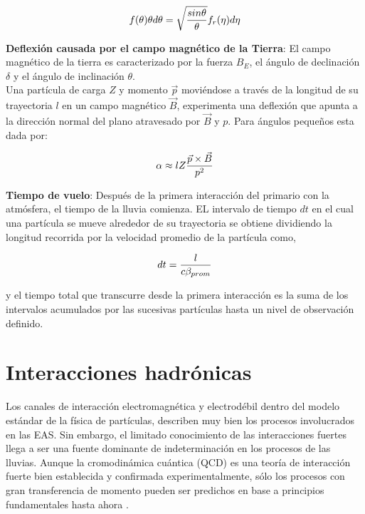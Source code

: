 \begin{equation}
\centering
f(\theta) \theta d\theta = \sqrt{\frac{sin\theta}{\theta}} f_{r}(\eta) d \eta
\label{eq:eq22}
\end{equation}

\textbf{Deflexión causada por el campo magnético de la Tierra}:  El campo magnético de la tierra es caracterizado por la fuerza $B_{E}$, el ángulo de declinación $\delta$ y el ángulo de inclinación $\theta$. \\

Una partícula de carga $Z$ y momento $\Vec{p}$ moviéndose a través de la longitud de su trayectoria $l$ en un campo magnético $\Vec{B}$, experimenta una deflexión que apunta a la dirección normal del plano atravesado por $\Vec{B}$ y $p$. Para ángulos pequeños esta dada por:

\begin{equation}
\centering
\alpha \approx lZ \frac{\Vec{p} \times \Vec{B}}{p^{2}}
\label{eq:eq23}
\end{equation}

\textbf{Tiempo de vuelo}: Después de la primera interacción del primario con la atmósfera, el tiempo de la lluvia comienza. EL intervalo de tiempo $dt$ en el cual una partícula se mueve alrededor de su trayectoria se obtiene dividiendo la longitud recorrida por la velocidad promedio de la partícula como,

\begin{equation}
\centering
dt = \frac{l}{c\beta_{prom}}
\label{eq:eq24}
\end{equation}

y el tiempo total que transcurre desde la primera interacción es la suma de los intervalos acumulados por las sucesivas partículas hasta un nivel de observación definido.\\

\section{Interacciones hadr\'onicas}

Los canales de interacción electromagnética y electrodébil dentro del modelo estándar de la física de partículas, describen muy bien los procesos involucrados en las EAS. Sin embargo, el limitado conocimiento de las interacciones fuertes llega a ser una fuente dominante de indeterminación en los procesos de las lluvias. Aunque la cromodinámica cuántica (QCD) es una teoría de interacción fuerte bien establecida y confirmada experimentalmente, sólo los procesos con gran transferencia de momento pueden ser predichos en base a principios fundamentales hasta ahora \cite{Allen}. \\

